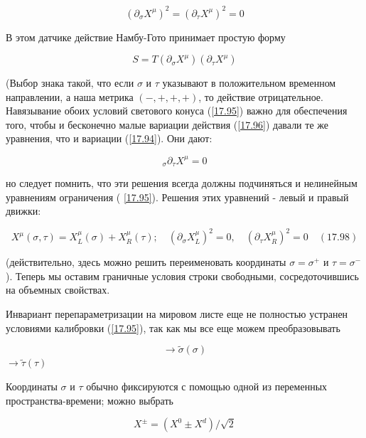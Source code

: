 \documentclass[main.tex]{subfiles}
\begin{document}
\begin{equation}\label{17.95}
\left(\partial_{\sigma} X^{\mu}\right)^{2}=\left(\partial_{\tau} X^{\mu}\right)^{2}=0
\end{equation}

В этом датчике действие Намбу-Гото принимает простую форму

\begin{equation}\label{17.96}
S=T\left(\partial_{\sigma} X^{\mu}\right)\left(\partial_{\tau} X^{\mu}\right)
\end{equation}

(Выбор знака такой, что если $\sigma$ и $\tau$ указывают в положительном временном направлении, а наша метрика $(-,+,+,+)$, то действие отрицательное. Навязывание обоих условий светового конуса (\ref{17.95}) важно для обеспечения того, чтобы и бесконечно малые вариации действия (\ref{17.96}) давали те же уравнения, что и вариации (\ref{17.94}). Они дают:

\begin{equation}\label{17.97}
_{\sigma} \partial_{\tau} X^{\mu}=0
\end{equation}

но следует помнить, что эти решения всегда должны подчиняться и нелинейным уравнениям ограничения ( \ref{17.95}). Решения этих уравнений - левый и правый движки:

\begin{equation}\label{17.98}
X^{\mu}(\sigma, \tau)=X_{L}^{\mu}(\sigma)+X_{R}^{\mu}(\tau) ; \quad\left(\partial_{\sigma} X_{L}^{\mu}\right)^{2}=0, \quad\left(\partial_{\tau} X_{R}^{\mu}\right)^{2}=0 \quad(17.98)
\end{equation}

(действительно, здесь можно решить переименовать координаты $\sigma=\sigma^{+}$ и $\tau=\sigma^{-}$ ). Теперь мы оставим граничные условия строки свободными, сосредоточившись на объемных свойствах.

Инвариант перепараметризации на мировом листе еще не полностью устранен условиями калибровки (\ref{17.95}), так как мы все еще можем преобразовывать

\begin{equation}\label{17.99}
\rightarrow \tilde{\sigma}(\sigma)
\end{equation}
$\rightarrow \tilde{\tau}(\tau)$

Координаты $\sigma$ и $\tau$ обычно фиксируются с помощью одной из переменных пространства-времени; можно выбрать

\begin{equation}\label{17.100}
X^{\pm}=\left(X^{0} \pm X^{d}\right) / \sqrt{2}
\end{equation}
\end{document}
